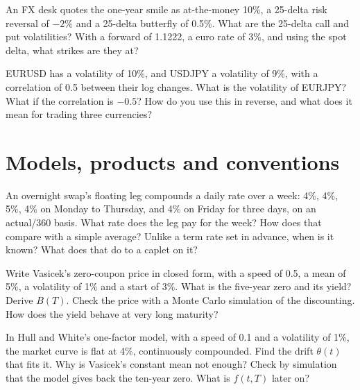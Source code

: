 \begin{question}\label{iq:iv2:rates-and-fx:32}
An FX desk quotes the one-year smile as at-the-money 10\%, a 25-delta risk reversal of $-2\%$ and a 25-delta butterfly of 0.5\%. What are the 25-delta call and put volatilities? With a forward of 1.1222, a euro rate of 3\%, and using the spot delta, what strikes are they at?
\end{question}

\begin{question}\label{iq:iv2:rates-and-fx:33}
EURUSD has a volatility of 10\%, and USDJPY a volatility of 9\%, with a correlation of 0.5 between their log changes. What is the volatility of EURJPY? What if the correlation is $-0.5$? How do you use this in reverse, and what does it mean for trading three currencies?
\end{question}

\section{Models, products and conventions}

\begin{question}\label{iq:iv2:rates-and-fx:34}
An overnight swap's floating leg compounds a daily rate over a week: 4\%, 4\%, 5\%, 4\% on Monday to Thursday, and 4\% on Friday for three days, on an actual/360 basis. What rate does the leg pay for the week? How does that compare with a simple average? Unlike a term rate set in advance, when is it known? What does that do to a caplet on it?
\end{question}

\begin{question}\label{iq:iv2:rates-and-fx:35}
Write Vasicek's zero-coupon price in closed form, with a speed of 0.5, a mean of 5\%, a volatility of 1\% and a start of 3\%. What is the five-year zero and its yield? Derive $B(T)$. Check the price with a Monte Carlo simulation of the discounting. How does the yield behave at very long maturity?
\end{question}

\begin{question}\label{iq:iv2:rates-and-fx:36}
In Hull and White's one-factor model, with a speed of 0.1 and a volatility of 1\%, the market curve is flat at 4\%, continuously compounded. Find the drift $\theta(t)$ that fits it. Why is Vasicek's constant mean not enough? Check by simulation that the model gives back the ten-year zero. What is $f(t,T)$ later on?
\end{question}

